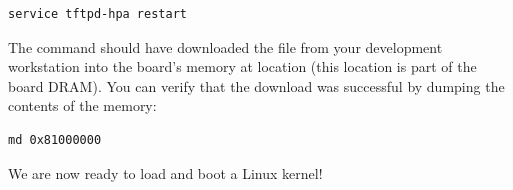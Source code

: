 \begin{verbatim}
service tftpd-hpa restart
\end{verbatim}

The  command should have downloaded the
 file from your development workstation into the
board's memory at location  (this location is part of
the board DRAM). You can verify that the download was successful by
dumping the contents of the memory:

\begin{verbatim}
md 0x81000000
\end{verbatim}

We are now ready to load and boot a Linux kernel!
